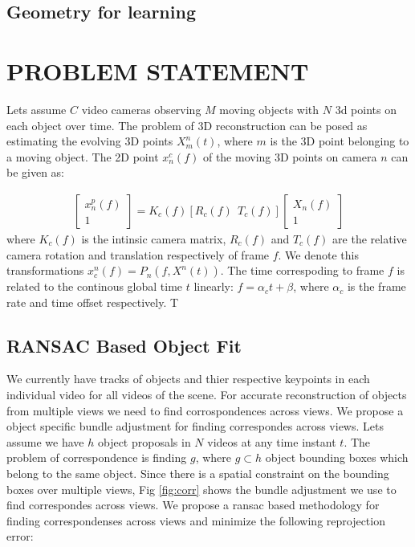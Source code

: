 \documentclass[10pt,twocolumn,letterpaper]{article}
\begin{document}
\subsection{Geometry for learning}
\section{PROBLEM STATEMENT}
Lets assume $C$ video cameras observing $M$ moving objects with $N$ 3d points on each object over time. The problem of 3D reconstruction can be posed as estimating the evolving 3D points $X_m^n(t)$, where $m$ is the 3D point belonging to a moving object. The 2D point $x_n^c(f)$  of the moving 3D points on camera $n$ can be given as:

\begin{align*}
 \begin{bmatrix} x_n^p(f) \\ 1  \end{bmatrix} = K_c(f)[R_c(f) \ \  T_c(f)] \begin{bmatrix} X_n(f) \\ 1  \end{bmatrix}
\end{align*} 
where $K_c(f)$ is the intinsic camera matrix, $R_c(f)$ and $T_c(f)$ are the relative camera rotation and translation respectively of frame $f$.  We denote this transformations $x_c^n(f) = P_n(f,X^n(t))$. The time correspoding to frame $f$ is related to the continous global time $t$ linearly: $f=\alpha_c t+\beta$, where $\alpha_c$ is the frame rate  and time offset respectively. T





\subsection{RANSAC Based Object Fit}
\label{sec:RANSAC_FIT}
We currently have tracks of objects and thier respective keypoints in each individual video for all videos of the scene. For accurate reconstruction of objects from multiple views we need to find corrospondences across views. We propose a object specific bundle adjustment for finding correspondes across views. Lets assume we have $h$ object proposals in $N$ videos at any time instant $t$. The problem of correspondence is finding $g$, where $g \subset h$ object bounding boxes which belong to the same object. Since there is a spatial constraint on the bounding boxes over multiple views, Fig \ref{fig:corr} shows the bundle adjustment we use to find correspondes across views. We propose a ransac based methodology for finding correspondenses across views and minimize the following reprojection error:
\end{document}
